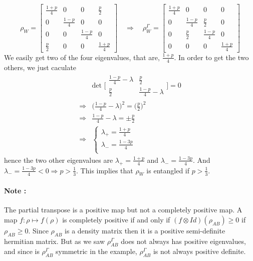 \documentclass{article}
\begin{document}
\begin{equation}
    \rho_W =
    \begin{bmatrix}
        \frac{1+p}{4} & 0 & 0 & \frac{p}{2} \\
        0 & \frac{1-p}{4} & 0 & 0 \\
        0 & 0 & \frac{1-p}{4} & 0 \\
        \frac{p}{2} & 0 & 0 & \frac{1+p}{4}
    \end{bmatrix}
    \quad
    \Rightarrow
    \quad
    \rho_W^\Gamma =
    \begin{bmatrix}
        \frac{1+p}{4} & 0 & 0 & 0 \\
        0 & \frac{1-p}{4} & \frac{p}{2} & 0 \\
        0 & \frac{p}{2} & \frac{1-p}{4} & 0 \\
        0 & 0 & 0 & \frac{1+p}{4}
    \end{bmatrix}
\end{equation}
We easily get two of the four eigenvalues, that are, $\frac{1+p}{4}$.
In order to get the two others, we just caculate
\begin{equation}
    \begin{aligned}
        &\text{det }\Big[\begin{smallmatrix}
            \frac{1-p}{4} - \lambda & \frac{p}{2} \\
            \frac{p}{2} & \frac{1-p}{4} - \lambda
        \end{smallmatrix}\Big]
             = 0\\
        \Rightarrow
            & \big(\frac{1-p}{4}-\lambda\big)^2
            = \Big(\frac{p}{2}\Big)^2\\
        \Rightarrow
            & \frac{1-p}{4}-\lambda = \pm \frac{p}{2} \\
        \Rightarrow
            & \begin{cases}
                \lambda_+ = \frac{1+p}{4}\\
                \lambda_- = \frac{1-3p}{4} \\
            \end{cases}
    \end{aligned}
\end{equation}
hence the two other eigenvalues are $ \lambda_+ = \frac{1+p}{4}$ and $\lambda_-
= \frac{1-3p}{4} $. And $\lambda_- = \frac{1-3p}{4} < 0 \Rightarrow p >
\frac{1}{3}$.
This implies that $\rho_W$ is entangled if $p>\frac{1}{3}$.

\paragraph{Note :} The partial transpose is a positive map but not a completely
positive map. A map $f: \rho \mapsto f(\rho)$ is completely positive if and only if
$(f \otimes Id)(\rho_{AB}) \geq 0$ if $\rho_{AB} \geq 0$. Since $\rho_{AB}$ is
a density matrix then it is a positive semi-definite hermitian matrix.
But as we saw $\rho_{AB}^\Gamma$ does not always has positive eigenvalues, and
since is $\rho_{AB}^\Gamma$ symmetric in the example, $\rho_{AB}^\Gamma$ is not
always positive definite.
\end{document}
